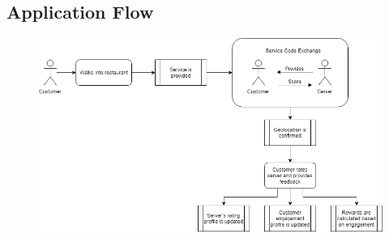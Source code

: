 \documentclass{scrreprt}
\begin{document}
\subsection{Application Flow}
\begin{figure}[h]
	\includegraphics[width=\textwidth]{uml/process-flow-diagram}
	\centering
\end{figure}




\end{document}
